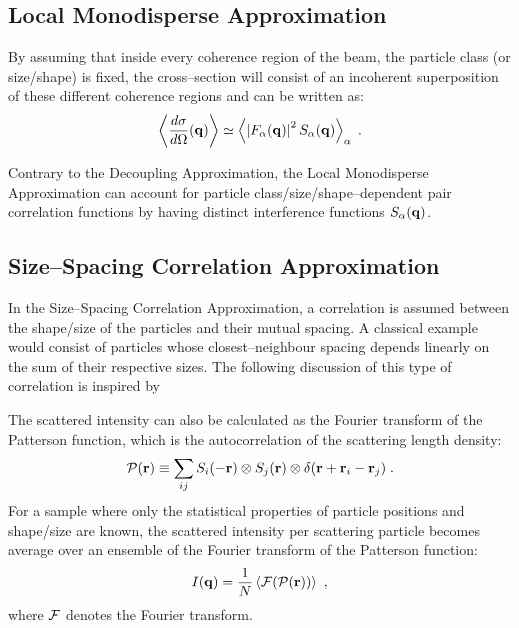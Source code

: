 \subsection{Local Monodisperse Approximation}
By assuming that inside every coherence region of the beam, the particle class (or size/shape) is fixed, the cross--section will consist of an incoherent superposition of these different coherence regions and can be written as:
\begin{equation*}
  \left\langle \frac{d\sigma}{d\Omega}(\mathbf{q}) \right\rangle \simeq \left\langle \left\lvert F_\alpha(\mathbf{q})\right\rvert ^2 S_\alpha(\mathbf{q}) \right\rangle_\alpha \; .
\end{equation*}

Contrary to the Decoupling Approximation, the Local Monodisperse Approximation can account for particle class/size/shape--dependent pair correlation functions by having distinct interference functions $S_\alpha(\mathbf{q})$.

\subsection{Size--Spacing Correlation Approximation}
In the Size--Spacing Correlation Approximation, a correlation is assumed between the shape/size of the particles and their mutual spacing. A classical example would consist of particles whose closest--neighbour spacing depends linearly on the sum of their respective sizes. The following discussion of this type of correlation is inspired by \cite{LaLe07}

The scattered intensity can also be calculated as the Fourier transform of the Patterson function, which is the autocorrelation of the scattering length density:
\begin{equation*}
  \mathcal{P} (\mathbf{r} ) \equiv \sum_{ij} S_i(-\mathbf{r} )\otimes S_j(\mathbf{r} )\otimes \delta (\mathbf{r} + \mathbf{r}_i - \mathbf{r}_j ) \; .
\end{equation*}
For a sample where only the statistical properties of particle positions and shape/size are known, the scattered intensity per scattering particle becomes average over an ensemble of the Fourier transform of the Patterson function:
\begin{equation*}
  I(\mathbf{q} ) = \frac{1}{N}\left\langle \mathcal{F} (\mathcal{P} (\mathbf{r} )) \right\rangle_{}  \; ,
\end{equation*}
where $\mathcal{F}$ denotes the Fourier transform.

